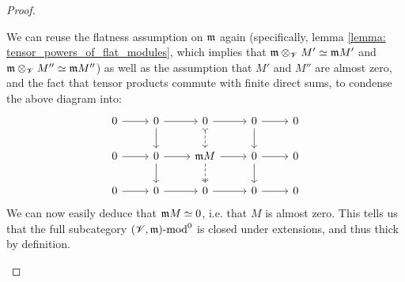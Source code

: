 \begin{proof}
\begin{enumerate}
$$                            $$
                        We can reuse the flatness assumption on $\mathfrak{m}$ again (specifically, lemma \ref{lemma: tensor_powers_of_flat_modules}, which implies that $\m \tensor_{\scrV} M' \cong \m M'$ and $\m \tensor_{\scrV} M'' \cong \m M''$) as well as the assumption that $M'$ and $M''$ are almost zero, and the fact that tensor products commute with finite direct sums, to condense the above diagram into:
                            $$
                                \begin{tikzcd}
                                	0 & 0 & 0 & 0 & 0 \\
                                	0 & 0 & {\m M} & 0 & 0 \\
                                	0 & 0 & 0 & 0 & 0
                                	\arrow[from=1-1, to=1-2]
                                	\arrow[from=1-2, to=1-3]
                                	\arrow[from=2-1, to=2-2]
                                	\arrow[from=2-2, to=2-3]
                                	\arrow[dashed, tail, from=1-3, to=2-3]
                                	\arrow[dashed, two heads, from=2-3, to=3-3]
                                	\arrow[from=1-2, to=2-2]
                                	\arrow[from=2-2, to=3-2]
                                	\arrow[from=3-1, to=3-2]
                                	\arrow[from=3-2, to=3-3]
                                	\arrow[from=1-3, to=1-4]
                                	\arrow[from=1-4, to=1-5]
                                	\arrow[from=2-3, to=2-4]
                                	\arrow[from=2-4, to=2-5]
                                	\arrow[from=1-4, to=2-4]
                                	\arrow[from=2-4, to=3-4]
                                	\arrow[from=3-3, to=3-4]
                                	\arrow[from=3-4, to=3-5]
                                \end{tikzcd}
                            $$
                        We can now easily deduce that $\mathfrak{m} M \simeq 0$, i.e. that $M$ is almost zero. This tells us that the full subcategory $(\mathscr{V}, \mathfrak{m})\text{-}\mathrm{mod}^0$ is closed under extensions, and thus thick by definition.
                    \end{enumerate}
                \end{proof}
